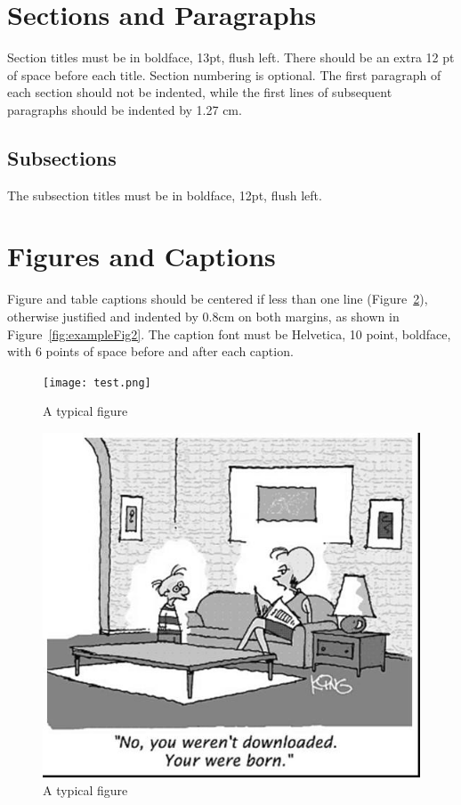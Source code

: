 \documentclass[12pt]{article}
\begin{document}
\section{Sections and Paragraphs}

Section titles must be in boldface, 13pt, flush left. There should be an extra
12 pt of space before each title. Section numbering is optional. The first
paragraph of each section should not be indented, while the first lines of
subsequent paragraphs should be indented by 1.27 cm.

\subsection{Subsections}

The subsection titles must be in boldface, 12pt, flush left.

\section{Figures and Captions}\label{sec:figs}


Figure and table captions should be centered if less than one line
(Figure~\ref{fig:exampleFig1}), otherwise justified and indented by 0.8cm on
both margins, as shown in Figure~\ref{fig:exampleFig2}. The caption font must
be Helvetica, 10 point, boldface, with 6 points of space before and after each
caption.

\begin{figure}[ht]
\centering
\texttt{[image: test.png]}
\caption{A typical figure}
\label{fig:exampleFig3}
\end{figure}

\begin{figure}[ht]
\centering
\includegraphics[width=.5\textwidth]{fig1.jpg}
\caption{A typical figure}
\label{fig:exampleFig1}
\end{figure}
\end{document}
